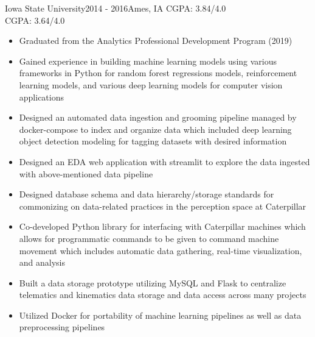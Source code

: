 \documentclass[10pt,a4paper]{altacv}
\begin{document}

\begin{fullwidth}
\makecvheader
\end{fullwidth}


 {Iowa State University}{2014 - 2016}{Ames, IA} 
\textsc{CGPA}: 3.84/4.0
\\
\textsc{CGPA}: 3.64/4.0
\\

\begin{itemize}
\item Graduated from the Analytics Professional Development Program (2019)
\item Gained experience in building machine learning models using various frameworks in Python for random forest regressions models, reinforcement learning models, and various deep learning models for computer vision applications
\item Designed an automated data ingestion and grooming pipeline managed by docker-compose to index and organize data which included deep learning object detection modeling for tagging datasets with desired information
\item Designed an EDA web application with streamlit to explore the data ingested with above-mentioned data pipeline
\item Designed database schema and data hierarchy/storage standards for commonizing on data-related practices in the perception space at Caterpillar
\item Co-developed Python library for interfacing with Caterpillar machines which allows for programmatic commands to be given to command machine movement which includes automatic data gathering, real-time visualization, and analysis
\item Built a data storage prototype utilizing MySQL and Flask to centralize telematics and kinematics data storage and data access across many projects
\item Utilized Docker for portability of machine learning pipelines as well as data preprocessing pipelines

\end{itemize}
\end{document}
